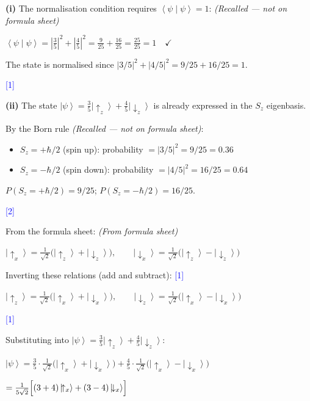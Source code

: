 \documentclass[12pt,a4paper]{article}
\newcommand{\markstep}[1]{\hfill\textcolor{blue}{[#1]}}
\newcommand{\finalanswer}[1]{%
  \begin{tcolorbox}[colback=green!5!white,colframe=green!50!black,boxrule=0.5pt]
  #1
  \end{tcolorbox}
}
\newcommand{\fromsheet}{\textit{(From formula sheet)}}
\newcommand{\recalled}{\textit{(Recalled --- not on formula sheet)}}
\renewcommand{\ket}[1]{\left|#1\right\rangle}
\renewcommand{\braket}[2]{\left\langle #1\middle|#2\right\rangle}
\begin{document}
\begin{parts}

\item

\textbf{(i)} The normalisation condition requires $\braket{\psi}{\psi} = 1$: \recalled

$\braket{\psi}{\psi} = \left|\frac{3}{5}\right|^2 + \left|\frac{4}{5}\right|^2 = \frac{9}{25} + \frac{16}{25} = \frac{25}{25} = 1 \quad\checkmark$

\finalanswer{The state is normalised since $|3/5|^2 + |4/5|^2 = 9/25 + 16/25 = 1$.} \markstep{1}

\textbf{(ii)} The state $\ket{\psi} = \frac{3}{5}\ket{\!\uparrow_z} + \frac{4}{5}\ket{\!\downarrow_z}$ is already expressed in the $S_z$ eigenbasis.

By the Born rule \recalled:
\begin{itemize}
\item $S_z = +\hbar/2$ (spin up): probability $= |3/5|^2 = 9/25 = 0.36$
\item $S_z = -\hbar/2$ (spin down): probability $= |4/5|^2 = 16/25 = 0.64$
\end{itemize}

\finalanswer{$P(S_z = +\hbar/2) = 9/25$; \quad $P(S_z = -\hbar/2) = 16/25$.} \markstep{2}

\item From the formula sheet: \fromsheet

$\ket{\!\uparrow_x} = \frac{1}{\sqrt{2}}\bigl(\ket{\!\uparrow_z} + \ket{\!\downarrow_z}\bigr), \qquad \ket{\!\downarrow_x} = \frac{1}{\sqrt{2}}\bigl(\ket{\!\uparrow_z} - \ket{\!\downarrow_z}\bigr)$

Inverting these relations (add and subtract): \markstep{1}

$\ket{\!\uparrow_z} = \frac{1}{\sqrt{2}}\bigl(\ket{\!\uparrow_x} + \ket{\!\downarrow_x}\bigr), \qquad \ket{\!\downarrow_z} = \frac{1}{\sqrt{2}}\bigl(\ket{\!\uparrow_x} - \ket{\!\downarrow_x}\bigr)$

\markstep{1}

Substituting into $\ket{\psi} = \frac{3}{5}\ket{\!\uparrow_z} + \frac{4}{5}\ket{\!\downarrow_z}$:

$\ket{\psi} = \frac{3}{5}\cdot\frac{1}{\sqrt{2}}\bigl(\ket{\!\uparrow_x} + \ket{\!\downarrow_x}\bigr) + \frac{4}{5}\cdot\frac{1}{\sqrt{2}}\bigl(\ket{\!\uparrow_x} - \ket{\!\downarrow_x}\bigr)$

$= \frac{1}{5\sqrt{2}}\Bigl[(3+4)\ket{\!\uparrow_x} + (3-4)\ket{\!\downarrow_x}\Bigr]$


\end{parts}
\end{document}
